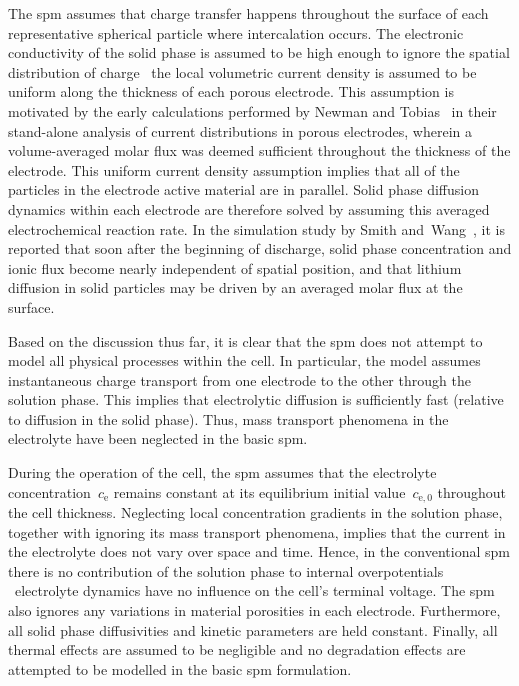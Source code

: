 The  \gls{spm}  assumes that  charge  transfer  happens throughout  the  surface
of  each  representative  spherical  particle where  intercalation  occurs.  The
electronic  conductivity of  the solid  phase is  assumed to  be high  enough to
ignore the  spatial distribution  of charge \ie~the local  volumetric current
density is assumed  to be uniform along the thickness  of each porous electrode.
This assumption is  motivated by the early calculations performed  by Newman and
Tobias~\cite{Newman1962} in their stand-alone  analysis of current distributions
in porous electrodes, wherein a volume-averaged molar flux was deemed sufficient
throughout  the  thickness  of  the  electrode.  This  uniform  current  density
assumption implies  that all of the  particles in the electrode  active material
are  in parallel.  Solid  phase  diffusion dynamics  within  each electrode  are
therefore solved by assuming this averaged electrochemical reaction rate. In the
simulation study  by Smith and~Wang~\cite{Smith2006},  it is reported  that soon
after  the beginning  of discharge,  solid  phase concentration  and ionic  flux
become nearly  independent of  spatial position, and  that lithium  diffusion in
solid particles may be driven by an averaged molar flux at the surface.


Based  on the  discussion thus  far, it  is clear  that the  \gls{spm} does  not
attempt to  model all  physical processes  within the  cell. In  particular, the
model assumes  instantaneous charge  transport from one  electrode to  the other
through  the  solution  phase.  This  implies  that  electrolytic  diffusion  is
sufficiently  fast  (relative to  diffusion  in  the  solid phase).  Thus,  mass
transport  phenomena  in  the  electrolyte  have been  neglected  in  the  basic
\gls{spm}.


During   the  operation   of  the   cell,   the  \gls{spm}   assumes  that   the
electrolyte  concentration~$c_\text{e}$  remains  constant  at  its  equilibrium
initial value~$c_{\text{e},0}$  throughout the cell thickness.  Neglecting local
concentration gradients in  the solution phase, together with  ignoring its mass
transport phenomena, implies  that the current in the electrolyte  does not vary
over  space  and  time.  Hence,  in  the  conventional  \gls{spm}  there  is  no
contribution of the solution phase  to internal overpotentials \ie~electrolyte
dynamics have  no influence on the  cell's terminal voltage. The  \gls{spm} also
ignores any  variations in material  porosities in each  electrode. Furthermore,
all solid phase diffusivities and kinetic parameters are held constant. Finally,
all thermal effects are assumed to  be negligible and no degradation effects are
attempted to be modelled in the basic \gls{spm} formulation.

